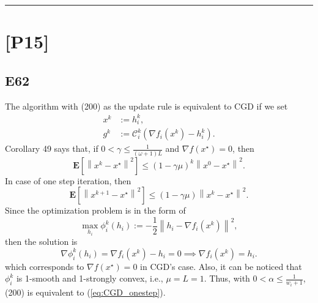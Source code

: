 \documentclass[12pt]{article}
\begin{document}
\hrule
\vspace{0.1cm}
\section*{[P15]}
\subsection*{E62}
The algorithm with (200) as the update rule is equivalent to CGD if we set
\begin{equation*}
    \begin{split}
        x^k &:= h_i^k, \\
        g^k &:= \mathcal{C}_i^k(\nabla f_i(x^k) - h_i^k).
    \end{split}
\end{equation*}
Corollary 49 says that, if $0 < \gamma \leq \frac{1}{(\omega+1)L}$ and $\nabla f(x^\star) = 0$, then
\begin{equation*}
    \mathbf{E}\left[\left\|x^k - x^\star \right\|^2\right] \leq (1-\gamma\mu)^k\left\|x^0 - x^\star\right\|^2.
\end{equation*}
In case of one step iteration, then
\begin{equation}
	\mathbf{E}\left[\left\|x^{k+1} - x^\star \right\|^2\right] \leq (1-\gamma\mu)\left\|x^k - x^\star\right\|^2.
	\label{eq:CGD_onestep}
\end{equation}
Since the optimization problem is in the form of
\begin{equation}
	\max_{h_i} \phi_i^k(h_i) := -\frac{1}{2}\left\| h_i - \nabla f_i(x^k)\right\|^2,
	\label{eq:maxoptproblem}
\end{equation}
then the solution is
\begin{equation}
	\nabla \phi_i^k(h_i) = \nabla f_i(x^k) -h_i = 0 \implies \nabla f_i(x^k) = h_i.
	\label{eq:maxoptproblemsol}
\end{equation}
which corresponds to $\nabla f(x^\star) = 0$ in CGD's case. Also, it can be noticed that $\phi_i^k$ is 1-smooth and 1-strongly convex, i.e., $\mu = L = 1$. Thus, with $0 < \alpha \leq \frac{1}{w_i + 1}$, (200) is equivalent to (\ref{eq:CGD_onestep}).
\end{document}
